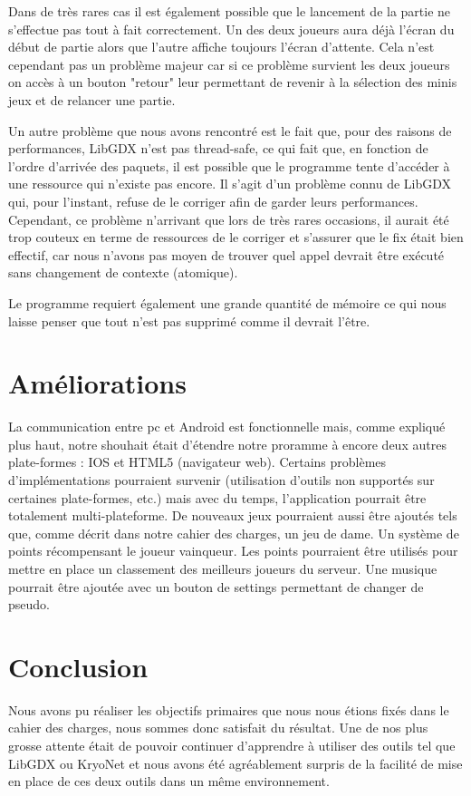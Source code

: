 \documentclass{report}
\begin{document}
Dans de très rares cas il est également possible que le lancement de la partie ne s'effectue pas tout à fait correctement. Un des deux joueurs aura déjà l'écran du début de partie alors
que l'autre affiche toujours l'écran d'attente. Cela n'est cependant pas un problème majeur car si ce problème survient les deux joueurs on accès à un bouton "retour" leur
permettant de revenir à la sélection des minis jeux et de relancer une partie.

Un autre problème que nous avons rencontré est le fait que, pour des raisons de performances, LibGDX n'est pas thread-safe, ce qui fait que, en fonction de l'ordre d'arrivée des paquets, il est possible que le programme tente d'accéder à une ressource qui n'existe pas encore. Il s'agit d'un problème connu de LibGDX qui, pour l'instant, refuse de le corriger afin de garder leurs performances. Cependant, ce problème n'arrivant que lors de très rares occasions, il aurait été trop couteux en terme de ressources de le corriger et s'assurer que le fix était bien effectif, car nous n'avons pas moyen de trouver quel appel devrait être exécuté sans changement de contexte (atomique).

Le programme requiert également une grande quantité de mémoire ce qui nous laisse penser que tout n'est pas supprimé comme il devrait l'être.

\chapter{Améliorations}
La communication entre pc et Android est fonctionnelle mais, comme expliqué plus haut, notre shouhait était d'étendre notre proramme à encore deux autres
plate-formes : IOS et HTML5 (navigateur web). Certains problèmes d'implémentations pourraient survenir (utilisation d'outils non supportés sur certaines plate-formes, etc.)
mais avec du temps, l'application pourrait être totalement multi-plateforme.
De nouveaux jeux pourraient aussi être ajoutés tels que, comme décrit dans notre cahier des charges,
un jeu de dame. Un système de points récompensant le joueur vainqueur. Les points pourraient être utilisés pour mettre en place un classement des meilleurs joueurs du serveur. Une musique pourrait être ajoutée avec un bouton de settings permettant de changer de pseudo.

\chapter{Conclusion}
Nous avons pu réaliser les objectifs primaires que nous nous étions fixés dans le cahier des charges, nous
sommes donc satisfait du résultat. Une de nos plus grosse attente était de pouvoir continuer d'apprendre à
utiliser des outils tel que LibGDX ou KryoNet et nous avons été agréablement surpris de la facilité de mise
en place de ces deux outils dans un même environnement.
\end{document}
